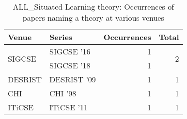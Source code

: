 \begin{table*}[t]
\begin{tabular}{llrr}
Venue & Series & Occurrences & Total\\\hline
\multirow{2}{*}{SIGCSE } & SIGCSE '16 & 1 & \multirow{2}{*}{2}\\
& SIGCSE '18 & 1 &\\
\multirow{1}{*}{DESRIST } & DESRIST '09 & 1 & \multirow{1}{*}{1}\\
\multirow{1}{*}{CHI } & CHI '98 & 1 & \multirow{1}{*}{1}\\
\multirow{1}{*}{ITiCSE } & ITiCSE '11 & 1 & \multirow{1}{*}{1}\\
\end{tabular}
\caption{ALL\_Situated Learning theory: Occurrences of papers naming a theory at various venues}
\end{table*}